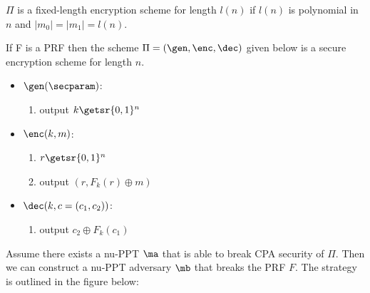 $\Pi$ is a fixed-length encryption scheme for length $l(n)$ if $l(n)$ is polynomial in $n$ and $|m_0| = |m_1| = l(n)$.

\begin{theorem}
    If F is a PRF then the scheme $\Pi = (\gen, \enc, \dec)$ given below is a secure encryption scheme for length $n$.

    \begin{itemize}
        \item $\gen(\secparam)$:
        \begin{enumerate}
            \item output $k \getsr \{0, 1\}^n$
        \end{enumerate}
        \item $\enc(k, m)$:
        \begin{enumerate}
            \item $r \getsr \{0, 1\}^n$
            \item output $(r, F_k(r) \oplus m)$
        \end{enumerate}
        \item $\dec(k, c=(c_1, c_2))$:
        \begin{enumerate}
            \item output $c_2 \oplus F_k(c_1)$
        \end{enumerate}
    \end{itemize}
    
\end{theorem}

\proof
Assume there exists a nu-PPT $\ma$ that is able to break CPA security of $\Pi$.
Then we can construct a nu-PPT adversary $\mb$ that breaks the PRF $F$.
The strategy is outlined in the figure below:

